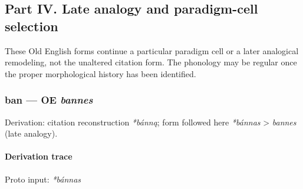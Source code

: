 \documentclass[
  british,
  a4paper,
]{article}
\begin{document}
\clearpage

\subsection{Part IV. Late analogy and paradigm-cell
selection}\label{part-iv.-late-analogy-and-paradigm-cell-selection}

These Old English forms continue a particular paradigm cell or a later
analogical remodeling, not the unaltered citation form. The phonology
may be regular once the proper morphological history has been
identified.

\subsubsection{\texorpdfstring{ban --- OE
\emph{bannes}}{ban --- OE bannes}}\label{ban-oe-bannes}

Derivation: citation reconstruction \emph{*bánną}; form followed here
\emph{*bánnas} \textgreater{} \emph{bannes} (late analogy).

\paragraph{Derivation trace}\label{derivation-trace-122}

Proto input: \emph{*bánnas}

\begingroup
\setlength{\fboxsep}{6pt}
\end{document}
